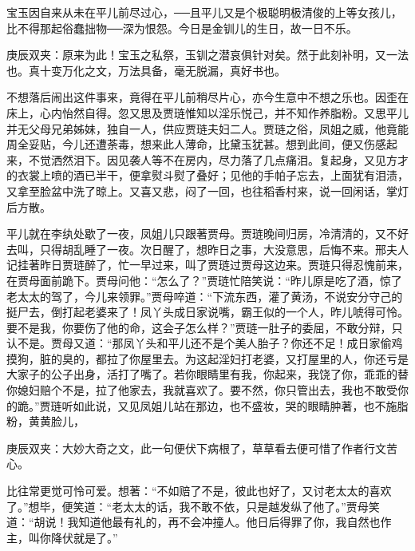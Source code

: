 \begin{parag}
    宝玉因自来从未在平儿前尽过心，──且平儿又是个极聪明极清俊的上等女孩儿，比不得那起俗蠢拙物──深为恨怨。今日是金钏儿的生日，故一日不乐。\begin{note}庚辰双夹：原来为此！宝玉之私祭，玉钏之潜哀俱针对矣。然于此刻补明，又一法也。真十变万化之文，万法具备，毫无脱漏，真好书也。\end{note}不想落后闹出这件事来，竟得在平儿前稍尽片心，亦今生意中不想之乐也。因歪在床上，心内怡然自得。忽又思及贾琏惟知以淫乐悦己，并不知作养脂粉。又思平儿并无父母兄弟姊妹，独自一人，供应贾琏夫妇二人。贾琏之俗，凤姐之威，他竟能周全妥贴，今儿还遭荼毒，想来此人薄命，比黛玉犹甚。想到此间，便又伤感起来，不觉洒然泪下。因见袭人等不在房内，尽力落了几点痛泪。复起身，又见方才的衣裳上喷的酒已半干，便拿熨斗熨了叠好；见他的手帕子忘去，上面犹有泪渍，又拿至脸盆中洗了晾上。又喜又悲，闷了一回，也往稻香村来，说一回闲话，掌灯后方散。
\end{parag}


\begin{parag}
    平儿就在李纨处歇了一夜，凤姐儿只跟著贾母。贾琏晚间归房，冷清清的，又不好去叫，只得胡乱睡了一夜。次日醒了，想昨日之事，大没意思，后悔不来。邢夫人记挂著昨日贾琏醉了，忙一早过来，叫了贾琏过贾母这边来。贾琏只得忍愧前来，在贾母面前跪下。贾母问他：“怎么了？”贾琏忙陪笑说：“昨儿原是吃了酒，惊了老太太的驾了，今儿来领罪。”贾母啐道：“下流东西，灌了黄汤，不说安分守己的挺尸去，倒打起老婆来了！凤丫头成日家说嘴，霸王似的一个人，昨儿唬得可怜。要不是我，你要伤了他的命，这会子怎么样？”贾琏一肚子的委屈，不敢分辩，只认不是。贾母又道：“那凤丫头和平儿还不是个美人胎子？你还不足！成日家偷鸡摸狗，脏的臭的，都拉了你屋里去。为这起淫妇打老婆，又打屋里的人，你还亏是大家子的公子出身，活打了嘴了。若你眼睛里有我，你起来，我饶了你，乖乖的替你媳妇赔个不是，拉了他家去，我就喜欢了。要不然，你只管出去，我也不敢受你的跪。”贾琏听如此说，又见凤姐儿站在那边，也不盛妆，哭的眼睛肿著，也不施脂粉，黄黄脸儿，\begin{note}庚辰双夹：大妙大奇之文，此一句便伏下病根了，草草看去便可惜了作者行文苦心。\end{note}比往常更觉可怜可爱。想著：“不如赔了不是，彼此也好了，又讨老太太的喜欢了。”想毕，便笑道：“老太太的话，我不敢不依，只是越发纵了他了。”贾母笑道：“胡说！我知道他最有礼的，再不会冲撞人。他日后得罪了你，我自然也作主，叫你降伏就是了。”
\end{parag}


